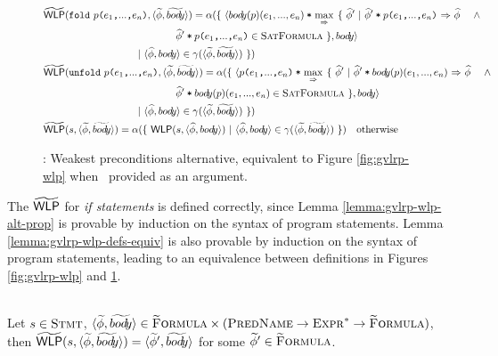 \documentclass {llncs}
\begin{document}
\begin{figure}[h!]
\begin{small}
\begin{align*}
%
            &\gWP(\sFold {\ttt{$p$($e_1$,$...$,$e_n$)}},\langle \gphi, \grad{\bodyBareAny} \rangle)
            = \alpha(\{~ \langle \phiCons{\bodyBareAny(p)(e_1,...,e_n)}{} \maximp~ \{~ \sphi' ~|~ \phiImplies{\phiCons{\sphi'}{\ttt{$p$($e_1$,$...$,$e_n$)}}}{\sphi} ~~~~\wedge \\
            &\hspace*{131pt} \phiCons{\sphi'}{\ttt{$p$($e_1$,$...$,$e_n$)}} \in \setFormulaA ~\}, \bodyBareAny \rangle\\
            &\hspace*{90pt} ~|~ \langle \sphi,\bodyBareAny \rangle \in \gamma(\langle \gphi, \grad{\bodyBareAny} \rangle) ~\}) \\
%
			&\gWP(\sUnfold {\ttt{$p$($e_1$,$...$,$e_n$)}},\langle \gphi, \grad{\bodyBareAny} \rangle)
            = \alpha(\{~ \langle \phiCons{\ttt{$p$($e_1$,$...$,$e_n$)}}{} \maximp~ \{~ \sphi' ~|~ \phiImplies{\phiCons{\sphi'}{\bodyBareAny(p)(e_1,...,e_n)}}{\sphi} ~~~~\wedge \\
            &\hspace*{131pt} \phiCons{\sphi'}{\bodyBareAny(p)(e_1,...,e_n)} \in \setFormulaA ~\}, \bodyBareAny \rangle \\
            &\hspace*{90pt} ~|~ \langle \sphi,\bodyBareAny \rangle \in \gamma(\langle \gphi, \grad{\bodyBareAny} \rangle) ~\}) \\
%
            &\gWP(s, \langle \gphi, \grad{\bodyBareAny} \rangle)
            = \alpha(\{~ \WP(s, \langle \sphi, \bodyBareAny \rangle) ~|~ \langle \sphi, \bodyBareAny \rangle \in \gamma(\langle \gphi,\grad{\bodyBareAny} \rangle) ~\}) \quad \text{otherwise}
        \end{align*}
    \end{small}
    \caption{\gvlidf: Weakest preconditions alternative, equivalent to Figure \ref{fig:gvlrp-wlp} when \bodyBare~provided as an argument.}
    \label{fig:gvlrp-wlp-alt}
\end{figure}

The $\widetilde{\textup{\textmd{\textsf{WLP}}}}$ for \textit{if statements} is defined correctly, since Lemma \ref{lemma:gvlrp-wlp-alt-prop} is provable by induction on the syntax of program statements. Lemma \ref{lemma:gvlrp-wlp-defs-equiv} is also provable by induction on the syntax of program statements, leading to an equivalence between definitions in Figures \ref{fig:gvlrp-wlp} and \ref{fig:gvlrp-wlp-alt}.

\begin{lemma}\label{lemma:gvlrp-wlp-alt-prop}~\\
Let $s \in \textup{\textsc{Stmt}}$, $\langle \widetilde{\phi}, \widetilde{bod{\!y}} \rangle \in \textup{\textsc{\ensuremath{\widetilde{\text{F}}}ormula}} \times (\textup{\textsc{PredName}} \rightarrow \textup{\textsc{Expr}}^* \rightarrow \textup{\textsc{\ensuremath{\widetilde{\text{F}}}ormula}})$, \\

\noindent then $\widetilde{\textup{\textmd{\textsf{WLP}}}}(s, \langle \widetilde{\phi}, \widetilde{bod{\!y}} \rangle) = \langle \widetilde{\phi}', \widetilde{bod{\!y}} \rangle$ for some $\widetilde{\phi}' \in \textup{\textsc{\ensuremath{\widetilde{\text{F}}}ormula}}$.
\end{lemma}
\end{document}
